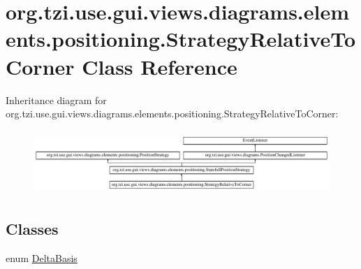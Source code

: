 \hypertarget{classorg_1_1tzi_1_1use_1_1gui_1_1views_1_1diagrams_1_1elements_1_1positioning_1_1_strategy_relative_to_corner}{\section{org.\-tzi.\-use.\-gui.\-views.\-diagrams.\-elements.\-positioning.\-Strategy\-Relative\-To\-Corner Class Reference}
\label{classorg_1_1tzi_1_1use_1_1gui_1_1views_1_1diagrams_1_1elements_1_1positioning_1_1_strategy_relative_to_corner}
}
Inheritance diagram for org.\-tzi.\-use.\-gui.\-views.\-diagrams.\-elements.\-positioning.\-Strategy\-Relative\-To\-Corner\-:\begin{figure}[H]
\begin{center}
\leavevmode
\includegraphics[height=2.445415cm]{classorg_1_1tzi_1_1use_1_1gui_1_1views_1_1diagrams_1_1elements_1_1positioning_1_1_strategy_relative_to_corner}
\end{center}
\end{figure}
\subsection*{Classes}
\begin{DoxyCompactItemize}
\item 
enum \hyperlink{enumorg_1_1tzi_1_1use_1_1gui_1_1views_1_1diagrams_1_1elements_1_1positioning_1_1_strategy_relative_to_corner_1_1_delta_basis}{Delta\-Basis}
\end{DoxyCompactItemize}

